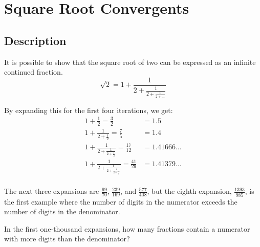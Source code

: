 \chapter{Square Root Convergents}
\section{Description}

It is possible to show that the square root of two can be expressed as an infinite continued fraction.
\[
	\sqrt{2} = 1 + \frac{1}{2 + \frac{1}{2 + \frac{1}{2 + \dots}}}
\]




By expanding this for the first four iterations, we get:
\begin{align*}
	1 + \frac{1}{2} = \frac{3}{2}                                             & = 1.5          \\
	1 + \frac{1}{2 + \frac{1}{2}} = \frac{7}{5}                               & = 1.4          \\
	1 + \frac{1}{2 + \frac{1}{2 + \frac{1}{2}}} = \frac{17}{12}               & = 1.41666\dots \\
	1 + \frac{1}{2 + \frac{1}{2 + \frac{1}{2 + \frac{1}{2}}}} = \frac{41}{29} & = 1.41379\dots \\
\end{align*}

The next three expansions are $\frac{99}{70}$, $\frac{239}{169}$, and $\frac{577}{408}$, but the eighth expansion,
$\frac{1393}{985}$, is the first example where the number of digits in the numerator exceeds the number of digits in the
denominator.

In the first one-thousand expansions, how many fractions contain a numerator with more digits than the denominator?
